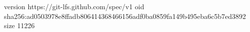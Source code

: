 version https://git-lfs.github.com/spec/v1
oid sha256:ad0503978e8ffadb806414368466156adf0ba0859fa149b495eba6c5b7ed3892
size 11226
